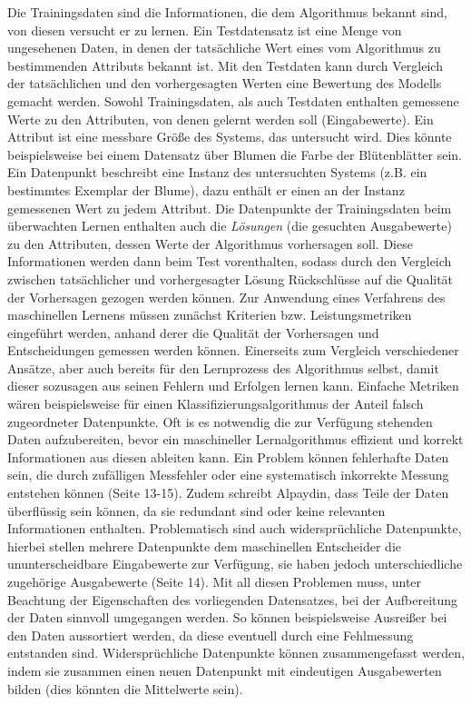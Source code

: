 \documentclass[
	12pt,
	a4paper,
	BCOR10mm,
	DIV14,
	listof=totoc,
	bibliography=totoc,
	headsepline
]{scrreprt}
\begin{document}
Die Trainingsdaten sind die Informationen, die dem Algorithmus bekannt sind, von diesen versucht er zu lernen. Ein Testdatensatz ist eine Menge von ungesehenen Daten, in denen der tatsächliche Wert eines vom Algorithmus zu bestimmenden Attributs bekannt ist. Mit den Testdaten kann durch Vergleich der tatsächlichen und den vorhergesagten Werten eine Bewertung des Modells gemacht werden.
Sowohl Trainingsdaten, als auch Testdaten enthalten gemessene Werte zu den Attributen, von denen gelernt werden soll (Eingabewerte).
Ein Attribut ist eine messbare Größe des Systems, das untersucht wird. Dies könnte beispielsweise bei einem Datensatz über Blumen die Farbe der Blütenblätter sein.
Ein Datenpunkt beschreibt eine Instanz des untersuchten Systems (z.B. ein bestimmtes Exemplar der Blume), dazu enthält er einen an der Instanz gemessenen Wert zu jedem Attribut.
Die Datenpunkte der Trainingsdaten beim überwachten Lernen enthalten auch die \textit{Lösungen} (die gesuchten Ausgabewerte) zu den Attributen, dessen Werte der Algorithmus vorhersagen soll. Diese Informationen werden dann beim Test vorenthalten, sodass durch den Vergleich zwischen tatsächlicher und vorhergesagter Lösung Rückschlüsse auf die Qualität der Vorhersagen gezogen werden können.
Zur Anwendung eines Verfahrens des maschinellen Lernens müssen zunächst Kriterien bzw. Leistungsmetriken eingeführt werden, anhand derer die Qualität der Vorhersagen und Entscheidungen gemessen werden können. Einerseits zum Vergleich verschiedener Ansätze, aber auch bereits für den Lernprozess des Algorithmus selbst, damit dieser sozusagen aus seinen Fehlern und Erfolgen lernen kann. Einfache Metriken wären beispielsweise für einen Klassifizierungsalgorithmus der Anteil falsch zugeordneter Datenpunkte.
Oft is es notwendig die zur Verfügung stehenden Daten aufzubereiten, bevor ein maschineller Lernalgorithmus effizient und korrekt Informationen aus diesen ableiten kann. Ein Problem können fehlerhafte Daten sein, die durch zufälligen Messfehler oder eine systematisch inkorrekte Messung entstehen können \cite{Alpaydin:2010:IML:1734076} (Seite 13-15). Zudem schreibt Alpaydin, dass Teile der Daten überflüssig sein können, da sie redundant sind oder keine relevanten Informationen enthalten. Problematisch sind auch widersprüchliche Datenpunkte, hierbei stellen mehrere Datenpunkte dem maschinellen Entscheider die ununterscheidbare Eingabewerte zur Verfügung, sie haben jedoch unterschiedliche zugehörige Ausgabewerte \cite{Alpaydin:2010:IML:1734076} (Seite 14).
Mit all diesen Problemen muss, unter Beachtung der Eigenschaften des vorliegenden Datensatzes, bei der Aufbereitung der Daten sinnvoll umgegangen werden. So können beispielsweise Ausreißer bei den Daten aussortiert werden, da diese eventuell durch eine Fehlmessung entstanden sind. Widersprüchliche Datenpunkte können zusammengefasst werden, indem sie zusammen einen neuen Datenpunkt mit eindeutigen Ausgabewerten bilden (dies könnten die Mittelwerte sein).
\end{document}

